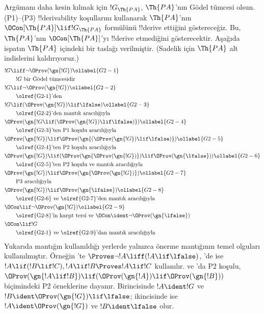 Argümanı daha kesin kılmak için $!G_\Th{PA}$, $\Th{PA}$'nın G\"odel tümcesi
olsun. (P1)--(P3) !!{derivability} koşullarını kullanarak $\Th{PA}$'nın
$\OCon[\Th{PA}] \lif !G_\Th{PA}$ formülünü !!{derive} ettiğini göstereceğiz.
Bu, $\Th{PA}$'nın $\OCon[\Th{PA}]$'yı !!{derive} etmediğini gösterecektir.
Aşağıda ispatın $\Th{PA}$ içindeki bir taslağı verilmiştir. (Sadelik için
$\Th{PA}$ alt indislerini kaldırıyoruz.)
\begin{align}
& !G \liff \lnot \OProv(\gn{!G}) \ollabel{G2-1}\\
& \qquad\text{$!G$ bir G\"odel tümcesidir}\notag \\
& !G \lif \lnot \OProv(\gn{!G}) \ollabel{G2-2}\\
  & \qquad\text{\olref{G2-1}'den} \notag\\
& !G \lif
  (\OProv(\gn{!G}) \lif \lfalse) \ollabel{G2-3}\\
  & \qquad\text{\olref{G2-2}'den mantık aracılığıyla}\notag\\
& \OProv(\gn{
    !G \lif
    (\OProv(\gn{!G}) \lif \lfalse)
  }) \ollabel{G2-4}\\
  & \qquad\text{\olref{G2-3}'ten P1 koşulu aracılığıyla} \notag\\
& \OProv(\gn{!G}) \lif
  \OProv(\gn{
    (\OProv(\gn{!G}) \lif \lfalse)
    }) \ollabel{G2-5}\\
  & \qquad\text{\olref{G2-4}'ten P2 koşulu aracılığıyla} \notag\\
& \OProv(\gn{!G}) \lif (\OProv(\gn{\OProv(\gn{!G})}) \lif \OProv(\gn{\lfalse})) \ollabel{G2-6}\\
  & \qquad\text{\olref{G2-5}'ten P2 koşulu ve mantık aracılığıyla} \notag\\
& \OProv(\gn{!G}) \lif 
  \OProv(\gn{\OProv(\gn{!G})}) \ollabel{G2-7}\\
   & \qquad\text{P3 aracılığıyla} \notag\\
& \OProv(\gn{!G}) \lif \OProv(\gn{\lfalse}) \ollabel{G2-8}\\
  & \qquad \text{\olref{G2-6} ve \olref{G2-7}'den mantık aracılığıyla}\notag\\
& \OCon \lif \lnot \OProv(\gn{!G}) \ollabel{G2-9}\\
  & \qquad\text{\olref{G2-8}'in karşıt tersi ve $\OCon \ident \lnot \OProv(\gn{\lfalse})$}\notag \\
& \OCon \lif !G \notag\\
  & \qquad\text{\olref{G2-1} ve \olref{G2-9}'dan mantık aracılığıyla}\notag
\end{align}
Yukarıda mantığın kullanıldığı yerlerde yalnızca önerme mantığının temel
olguları kullanılmıştır. Örneğin 'te
$\Proves \lnot!A \liff (!A\lif \lfalse)$, 'de ise
$!A \lif (!B \lif !C), !A \lif !B \Proves !A \lif !C$ kullanılır.
 ve 'da P2 koşulu,
$\OProv(\gn{!A \lif !B}) \lif
(\OProv(\gn{!A}) \lif \OProv(\gn{!B}))$ biçimindeki P2 örneklerine dayanır.
Birincisinde $!A \ident !G$ ve
$!B \ident \OProv(\gn{!G}) \lif \lfalse$; ikincisinde ise
$!A \ident \OProv(\gn{!G})$ ve $!B \ident \lfalse$ olur.

